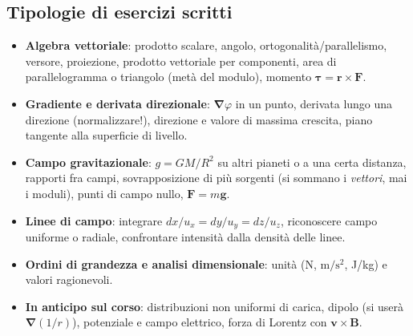 \documentclass[11pt,a4paper]{article}
\newcommand{\vv}[1]{\mathbf{#1}}
\newcommand{\nab}{\boldsymbol{\nabla}}
\begin{document}
\subsection{Tipologie di esercizi scritti}
\begin{itemize}[nosep]
\item \textbf{Algebra vettoriale}: prodotto scalare, angolo, ortogonalità/parallelismo, versore, proiezione, prodotto vettoriale per componenti, area di parallelogramma o triangolo (metà del modulo), momento $\boldsymbol\tau=\vv r\times\vv F$.
\item \textbf{Gradiente e derivata direzionale}: $\nab\varphi$ in un punto, derivata lungo una direzione (normalizzare!), direzione e valore di massima crescita, piano tangente alla superficie di livello.
\item \textbf{Campo gravitazionale}: $g=GM/R^2$ su altri pianeti o a una certa distanza, rapporti fra campi, sovrapposizione di più sorgenti (si sommano i \emph{vettori}, mai i moduli), punti di campo nullo, $\vv F=m\vv g$.
\item \textbf{Linee di campo}: integrare $dx/u_x=dy/u_y=dz/u_z$, riconoscere campo uniforme o radiale, confrontare intensità dalla densità delle linee.
\item \textbf{Ordini di grandezza e analisi dimensionale}: unità (N, $\mathrm{m/s^2}$, J/kg) e valori ragionevoli.
\item \textbf{In anticipo sul corso}: distribuzioni non uniformi di carica, dipolo (si userà $\nab(1/r)$), potenziale e campo elettrico, forza di Lorentz con $\vv v\times\vv B$.
\end{itemize}
\end{document}
